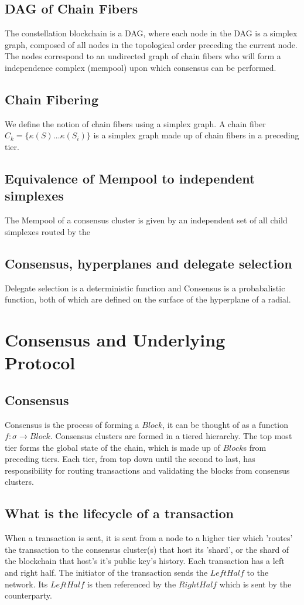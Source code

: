 \documentclass{article}
\begin{document}
\subsection{DAG of Chain Fibers}
The constellation blockchain is a DAG, where each node in the DAG is a simplex graph, composed of all nodes in the topological order preceding the current node. The nodes correspond to an undirected graph of chain fibers who will form a independence complex (mempool) upon which consensus can be performed.

\subsection{Chain Fibering}
We define the notion of chain fibers using a simplex graph. A chain fiber $C_k = \{\kappa(S) \dots \kappa(S_i) \}$ is a simplex graph made up of chain fibers in a preceding tier.

\subsection{Equivalence of Mempool to independent simplexes}
The Mempool of a consensus cluster is given by an independent set of all child simplexes routed by the

\subsection{Consensus, hyperplanes and delegate selection}
Delegate selection is a deterministic function and Consensus is a probabalistic function, both of which are defined on the surface of the hyperplane of a radial.


\section{Consensus and Underlying Protocol}
\subsection{Consensus}
Consensus is the process of forming a $Block$, it can be thought of as a function $f: \sigma \rightarrow Block$. Consensus clusters are formed in a tiered hierarchy. The top most tier forms the global state of the chain, which is made up of $Block$s from preceding tiers. Each tier, from top down until the second to last, has responsibility for routing transactions and validating the blocks from consensus clusters. 

\subsection{What is the lifecycle of a transaction}
When a transaction is sent, it is sent from a node to a higher tier which 'routes' the transaction to the consensus cluster(s) that host its 'shard', or the shard of the blockchain that host's it's public key's history. Each transaction has a left and right half. The initiator of the transaction sends the $LeftHalf$ to the network. Its $LeftHalf$ is then referenced by the $RightHalf$ which is sent by the counterparty.
\end{document}
